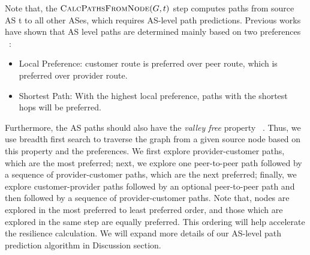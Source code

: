 Note that, the $\Call{CalcPathsFromNode}{G,t}$ step computes paths from source AS t to all other ASes, which requires AS-level path predictions. Previous works have shown that AS level paths are determined mainly based on two preferences ~\cite{gao2001stable}:

\begin{itemize}
\item Local Preference: customer route is preferred over peer route, which is preferred over provider route. 
\item Shortest Path: With the highest local preference, paths with the shortest hops will be preferred. 
\end{itemize}

Furthermore, the AS paths should also have the \emph{valley free} property ~\cite{gao2001inferring}. Thus, we use breadth first search to traverse the graph from a given source node based on this property and the preferences. We first explore provider-customer paths, which are the most preferred; next, we explore one peer-to-peer path followed by a sequence of provider-customer paths, which are the next preferred; finally, we explore customer-provider paths followed by an optional peer-to-peer path and then followed by a sequence of provider-customer paths. Note that, nodes are explored in the most preferred to least preferred order, and those which are explored in the same step are equally preferred. This ordering will help accelerate the resilience calculation. We will expand more details of our AS-level path prediction algorithm in Discussion section. 




